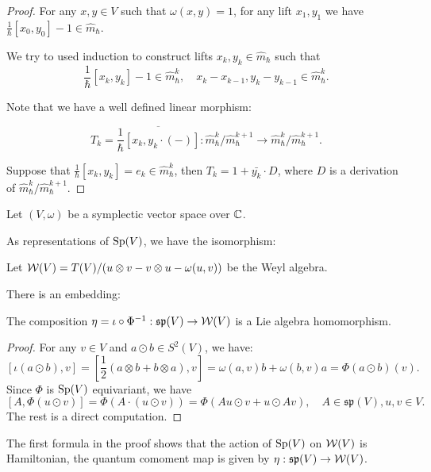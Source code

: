 \begin{proof}
  For any $x,y \in V$ such that $\omega(x,y) = 1$, for any lift $x_1,y_1$ we have $\frac{1}{\hbar}[x_0,y_0] - 1 \in \hat{m}_{\hbar}$. 
  
  We try to used induction to construct lifts $x_k,y_k \in \hat{m}_{\hbar}$ such that 
  \[
    \frac{1}{\hbar}[x_k,y_k] - 1 \in \hat{m}_{\hbar}^k, \quad x_k - x_{k-1}, y_k - y_{k-1} \in \hat{m}_{\hbar}^{k}.
  \]

  Note that we have a well defined linear morphism:

  \[
    T_k = \overline{\frac{1}{\hbar}[x_k, y_k \cdot (-)]}: \hat{m}_{\hbar}^{k}/\hat{m}_{\hbar}^{k+1} \to \hat{m}_{\hbar}^{k}/\hat{m}_{\hbar}^{k+1}.
  \]

  Suppose that $\frac{1}{\hbar}[x_k,y_k] = e_k \in \hat{m}_{\hbar}^k$, then $T_k = 1+ \bar{y_k} \cdot D$, where $D$ is a derivation of $\hat{m}_{\hbar}^{k}/\hat{m}_{\hbar}^{k+1}$. 
\end{proof}



Let $(V,\omega)$ be a symplectic vector space over $\mathbb{C}$.

As representations of $\operatorname{Sp}(V)$, we have the isomorphism:

Let $\mathcal{W}(V) = T(V)/(u\otimes v - v\otimes u - \omega(u,v))$ be the Weyl algebra.

There is an embedding:

\begin{prop}
  The composition $\eta = \iota \circ \Phi^{-1}: \mathfrak{sp}(V) \to \mathcal{W}(V)$ is a Lie algebra homomorphism.
\end{prop}

\begin{proof}
  For any $v \in V$ and $a \odot b \in S^2(V)$, we have:
  \[
    [\iota(a \odot b),v] = [\frac{1}{2}(a \otimes b + b \otimes a),v] = \omega(a,v)b + \omega(b,v)a = \Phi(a \odot b)(v).
  \]
  Since $\Phi$ is $\operatorname{Sp}(V)$ equivariant, we have
  \[
    [A, \Phi(u \odot v)] = \Phi(A \cdot (u \odot v)) = \Phi(Au \odot v + u \odot Av), \quad A \in \mathfrak{sp}(V), u,v \in V.
  \]
  The rest is a direct computation. 
\end{proof}

\begin{rk}
  The first formula in the proof shows that the action of $\operatorname{Sp}(V)$ on $\mathcal{W}(V)$ is Hamiltonian, the quantum comoment map is given by $\eta: \mathfrak{sp}(V) \to \mathcal{W}(V)$.
\end{rk}


